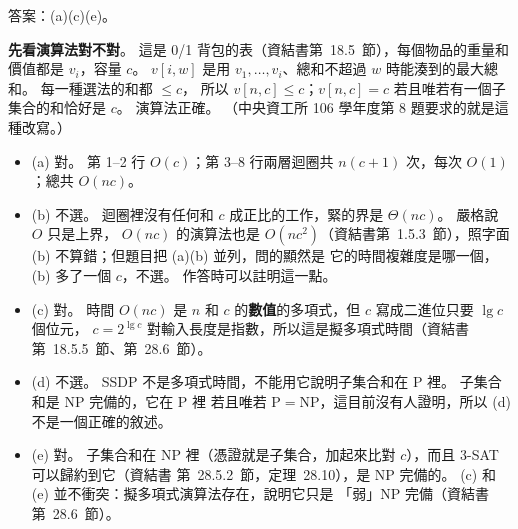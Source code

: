 \begin{pastsoln}
答案：(a)(c)(e)。

\textbf{先看演算法對不對}。 這是 0/1 背包的表（資結書第~18.5~節），每個物品的重量和價值都是 $v_i$，容量
$c$。 $v[i, w]$ 是用 $v_1, \ldots, v_i$、總和不超過 $w$ 時能湊到的最大總和。 每一種選法的和都 $\le c$，
所以 $v[n, c] \le c$；$v[n, c] = c$ 若且唯若有一個子集合的和恰好是 $c$。 演算法正確。 （中央資工所
106 學年度第 8 題要求的就是這種改寫。）

\begin{itemize}
\item (a) 對。 第 1--2 行 $O(c)$；第 3--8 行兩層迴圈共 $n(c + 1)$ 次，每次 $O(1)$；總共 $O(nc)$。
\item (b) 不選。 迴圈裡沒有任何和 $c$ 成正比的工作，緊的界是 $\Theta(nc)$。 嚴格說 $O$ 只是上界，
$O(nc)$ 的演算法也是 $O(nc^2)$（資結書第~1.5.3~節），照字面 (b) 不算錯；但題目把 (a)(b) 並列，問的顯然是
它的時間複雜度是哪一個，(b) 多了一個 $c$，不選。 作答時可以註明這一點。
\item (c) 對。 時間 $O(nc)$ 是 $n$ 和 $c$ 的\textbf{數值}的多項式，但 $c$ 寫成二進位只要 $\lg c$ 個位元，
$c = 2^{\lg c}$ 對輸入長度是指數，所以這是擬多項式時間（資結書第~18.5.5~節、第~28.6~節）。
\item (d) 不選。 SSDP 不是多項式時間，不能用它說明子集合和在 P 裡。 子集合和是 NP 完備的，它在 P 裡
若且唯若 $\mathrm{P} = \mathrm{NP}$，這目前沒有人證明，所以 (d) 不是一個正確的敘述。
\item (e) 對。 子集合和在 NP 裡（憑證就是子集合，加起來比對 $c$），而且 3-SAT 可以歸約到它（資結書
第~28.5.2~節，定理~28.10），是 NP 完備的。 (c) 和 (e) 並不衝突：擬多項式演算法存在，說明它只是
「弱」NP 完備（資結書第~28.6~節）。
\end{itemize}
\end{pastsoln}
